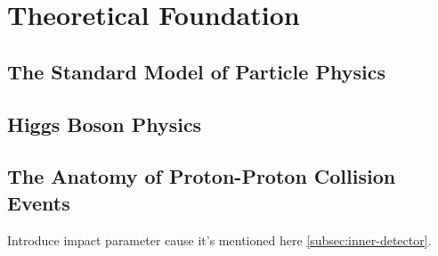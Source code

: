 \chapter{Theoretical Foundation}
\label{chap:theory}

\section{The Standard Model of Particle Physics}

\section{Higgs Boson Physics}


\section{The Anatomy of Proton-Proton Collision Events}
\label{sec:anatomy}
Introduce impact parameter cause it's mentioned here \cref{subsec:inner-detector}.



